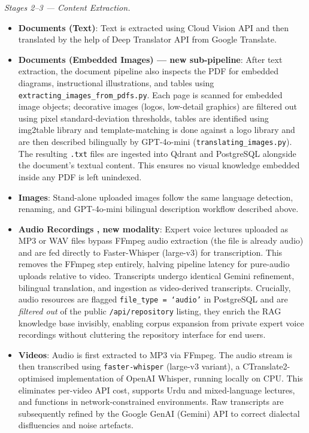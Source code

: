 \documentclass[conference]{IEEEtran}
\begin{document}
\textit{Stages 2--3 — Content Extraction.}
\begin{itemize}[noitemsep, leftmargin=*]
  \item \textbf{Documents (Text)}: Text is extracted using Cloud Vision API and then translated by the help of Deep Translator API from Google Translate.
  \item \textbf{Documents (Embedded Images) — new sub-pipeline}: After text extraction, the
        document pipeline also inspects the PDF for embedded diagrams, instructional illustrations,
        and tables using \texttt{extracting\_images\_from\_pdfs.py}. Each page is scanned for
        embedded image objects; decorative images (logos, low-detail graphics) are filtered out
        using pixel standard-deviation thresholds, tables are identified using img2table library and template-matching is done against a logo library and are then described bilingually by GPT-4o-mini
        (\texttt{translating\_images.py}). The resulting \texttt{.txt} files are ingested into
        Qdrant and PostgreSQL alongside the document's textual content. This ensures no
        visual knowledge embedded inside any PDF is left unindexed.

  \item \textbf{Images}: Stand-alone uploaded images follow the same language detection,
        renaming, and GPT-4o-mini bilingual description workflow described above.

  \item \textbf{Audio Recordings ,  new modality}: Expert voice lectures uploaded as
        MP3 or WAV files bypass FFmpeg audio extraction (the file is already audio) and
        are fed directly to Faster-Whisper (large-v3) for transcription. This removes
        the FFmpeg step entirely, halving pipeline latency for pure-audio uploads relative
        to video. Transcripts undergo identical Gemini refinement, bilingual translation,
        and ingestion as video-derived transcripts. Crucially, audio resources are flagged
        \texttt{file\_type = `audio'} in PostgreSQL and are \emph{filtered out} of the
        public \texttt{/api/repository} listing, they enrich the RAG knowledge base
        invisibly, enabling corpus expansion from private expert voice recordings without
        cluttering the repository interface for end users.

  \item \textbf{Videos}: Audio is first extracted to MP3 via FFmpeg. The audio stream is
        then transcribed using \texttt{faster-whisper} (large-v3 variant), a
        CTranslate2-optimised implementation of OpenAI Whisper, running locally on CPU.
        This eliminates per-video API cost, supports Urdu and mixed-language
        lectures, and functions in network-constrained environments. Raw transcripts are
        subsequently refined by the Google GenAI (Gemini) API to correct dialectal
        disfluencies and noise artefacts.
\end{itemize}
\end{document}
